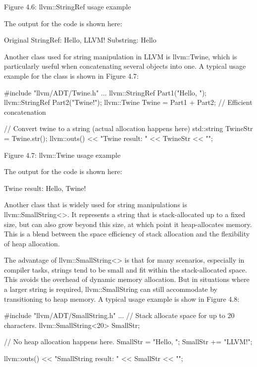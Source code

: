 \begin{center}
Figure 4.6: llvm::StringRef usage example
\end{center}

The output for the code is shown here:

\begin{shell}
Original StringRef: Hello, LLVM!
Substring: Hello
\end{shell}

Another class used for string manipulation in LLVM is llvm::Twine, which is particularly useful when concatenating several objects into one. A typical usage example for the class is shown in Figure 4.7:

\begin{cpp}
#include "llvm/ADT/Twine.h"
...
llvm::StringRef Part1("Hello, ");
llvm::StringRef Part2("Twine!");
llvm::Twine Twine = Part1 + Part2;  // Efficient concatenation

// Convert twine to a string (actual allocation happens here)
std::string TwineStr = Twine.str();
llvm::outs() << "Twine result: " << TwineStr << "\n";
\end{cpp}

\begin{center}
Figure 4.7: llvm::Twine usage example
\end{center}

The output for the code is shown here:

\begin{shell}
Twine result: Hello, Twine!
\end{shell}

Another class that is widely used for string manipulations is llvm::SmallString<>. It represents a string that is stack-allocated up to a fixed size, but can also grow beyond this size, at which point it heap-allocates memory. This is a blend between the space efficiency of stack allocation and the flexibility of heap allocation.

The advantage of llvm::SmallString<> is that for many scenarios, especially in compiler tasks, strings tend to be small and fit within the stack-allocated space. This avoids the overhead of dynamic memory allocation. But in situations where a larger string is required, llvm::SmallString can still accommodate by transitioning to heap memory. A typical usage example is show in Figure 4.8:

\begin{cpp}
#include "llvm/ADT/SmallString.h"
...
// Stack allocate space for up to 20 characters.
llvm::SmallString<20> SmallStr;

// No heap allocation happens here.
SmallStr = "Hello, ";
SmallStr += "LLVM!";

llvm::outs() << "SmallString result: " << SmallStr << "\n";
\end{cpp}

